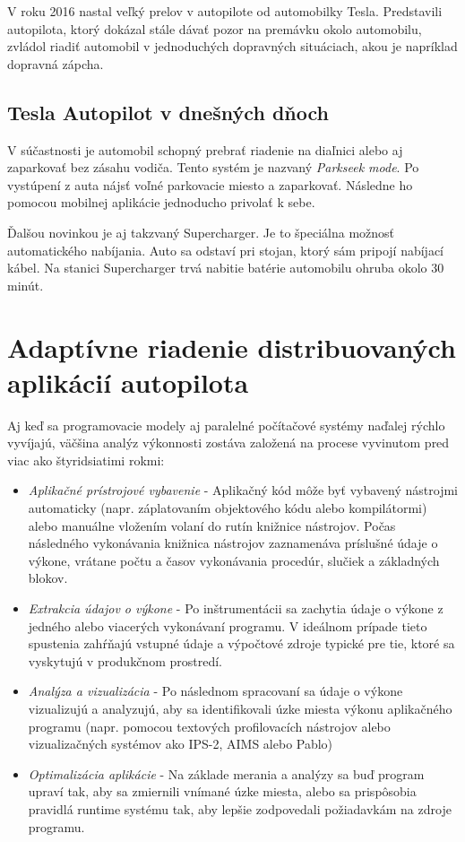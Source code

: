 \documentclass[10pt,twoside,slovak,a4paper]{article}
\begin{document}
V roku 2016 nastal veľký prelov v autopilote od automobilky Tesla. Predstavili autopilota, ktorý dokázal stále dávať pozor na premávku okolo automobilu, zvládol riadiť automobil v jednoduchých dopravných situáciach, akou je napríklad dopravná zápcha. \cite{TeslaAutopilot}

\subsection{Tesla Autopilot v dnešných dňoch}

V súčastnosti je automobil schopný prebrať riadenie na diaľnici alebo aj zaparkovať bez zásahu vodiča. Tento systém je nazvaný \emph{Parkseek mode}. Po vystúpení z auta nájsť voľné parkovacie miesto a zaparkovať. Následne ho pomocou mobilnej aplikácie jednoducho privolať k sebe. 

Ďalšou novinkou je aj takzvaný Supercharger. Je to špeciálna možnosť automatického nabíjania. Auto sa odstaví pri stojan, ktorý sám pripojí nabíjací kábel. Na stanici Supercharger trvá nabitie batérie automobilu ohruba okolo 30 minút. \cite{TeslaAutopilot}

\section{Adaptívne riadenie distribuovaných aplikácií autopilota} \label{ARDAA}

Aj keď sa programovacie modely aj paralelné počítačové systémy naďalej rýchlo vyvíjajú, väčšina analýz výkonnosti zostáva založená na procese vyvinutom pred viac ako štyridsiatimi rokmi:

\begin{itemize}
\item \emph{Aplikačné prístrojové vybavenie} - Aplikačný kód môže byť vybavený nástrojmi automaticky (napr. záplatovaním objektového kódu alebo kompilátormi) alebo manuálne vložením volaní do rutín knižnice nástrojov. Počas následného vykonávania knižnica nástrojov zaznamenáva príslušné údaje o výkone, vrátane počtu a časov vykonávania procedúr, slučiek a základných blokov.
\item\emph{Extrakcia údajov o výkone} - Po inštrumentácii sa zachytia údaje o výkone z jedného alebo viacerých vykonávaní programu. V ideálnom prípade tieto spustenia zahŕňajú vstupné údaje a výpočtové zdroje typické pre tie, ktoré sa vyskytujú v produkčnom prostredí.
\item\emph{Analýza a vizualizácia} - Po následnom spracovaní sa údaje o výkone vizualizujú a analyzujú, aby sa identifikovali úzke miesta výkonu aplikačného programu (napr. pomocou textových profilovacích nástrojov alebo vizualizačných systémov ako IPS-2, AIMS  alebo Pablo)
\item\emph{Optimalizácia aplikácie} - Na základe merania a analýzy sa buď program upraví tak, aby sa zmiernili vnímané úzke miesta, alebo sa prispôsobia pravidlá runtime systému tak, aby lepšie zodpovedali požiadavkám na zdroje programu. 
\end{itemize}
\end{document}
